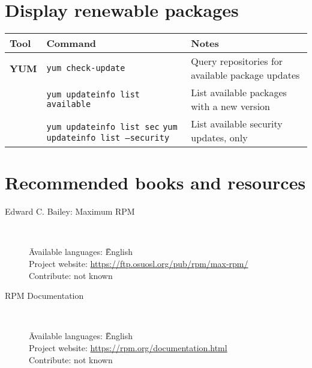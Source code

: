 \documentclass[10pt]{article}
\begin{document}
\section{Display renewable packages}
\begin{tabular}{ p{3.5cm} p{9cm} p{11cm}}
  \hline
  \rowcolor{Gray}
  \textbf{Tool} & \textbf{Command} & \textbf{Notes} \\
  \hline 
  \textbf{YUM} & \texttt{yum check-update} & Query repositories for available package updates\\
  \rowcolor{Gray}
  & \texttt{yum updateinfo list available} & List available packages with a new version\\
  & \texttt{yum updateinfo list sec} \newline \texttt{yum updateinfo list --security} & List available security updates, only \\
  \hline
\end{tabular}

\section{Recommended books and resources}

\begin{description}

    \item[Edward C. Bailey: Maximum RPM] ~ \\
        \begin{tabbing}
            \= Available languages: \= \= English \\
            \> Project website: \> \> \href{https://ftp.osuosl.org/pub/rpm/max-rpm/}{https://ftp.osuosl.org/pub/rpm/max-rpm/} \\
            \> Contribute: \> \> not known \\
        \end{tabbing}
        
    \item[RPM Documentation] ~ \\
        \begin{tabbing}
            \= Available languages: \= \= English \\
            \> Project website: \> \> \href{https://rpm.org/documentation.html}{https://rpm.org/documentation.html} \\
            \> Contribute: \> \> not known \\
        \end{tabbing}
    \end{description}
\end{document}
